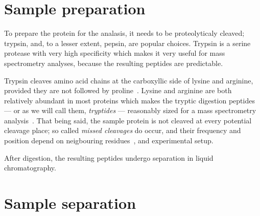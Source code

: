 \section{Sample preparation}\label{sec:trypsin}


To prepare the protein for the analasis, it needs to be proteolyticaly cleaved; trypsin, and, to a lesser extent, pepsin, are popular choices. Trypsin is a serine protease with very high specificity which makes it very useful for mass spectrometry analyses, because the resulting peptides are predictable.

Trypsin cleaves amino acid chains at the carboxyllic side of lysine and arginine, provided they are not followed by proline~\cite{olsen2004trypsin}. Lysine and arginine are both relatively abundant in most proteins which makes the tryptic digestion peptides --- or as we will call them, \emph{tryptides} --- reasonably sized for a mass spectrometry analysis~\cite{matthiesen2020trypticsize}. That being said, the sample protein is not cleaved at every potential cleavage place; so called \emph{missed cleavages} do occur, and their frequency and position depend on neigbouring residues~\cite{gershon2014cleaved}, and experimental setup.



After digestion, the resulting peptides undergo separation in liquid chromatography.

\section{Sample separation}

